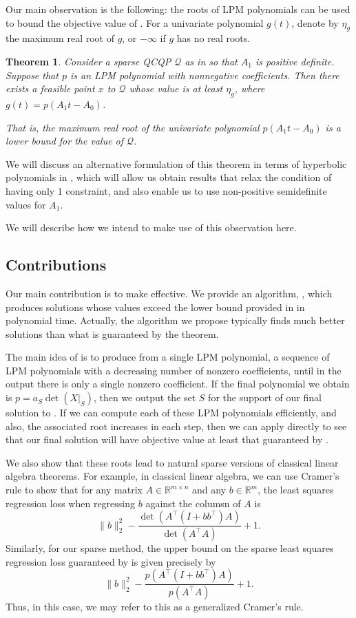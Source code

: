 \documentclass{amsart}
\newtheorem{theorem}{Theorem}[section]
\theoremstyle{definition}
\newcommand{\R}{\mathbb{R}}
\begin{document}
Our main observation is the following: the roots of LPM polynomials can be used to bound the objective value of .
For a univariate polynomial $g(t)$, denote by $\eta_g$ the maximum real root of $g$, or $-\infty$ if $g$ has no real roots.
\begin{theorem}
    \label{thm:root_thm}
    Consider a sparse QCQP $\mathcal{Q}$ as in  so that $A_1$ is positive definite.
    Suppose that $p$ is an LPM polynomial with nonnegative coefficients.
    Then there exists a feasible point $x$ to $\mathcal{Q}$ whose value is at least $\eta_g$, where $g(t) = p(A_1 t - A_0)$.

    That is, the maximum real root of the univariate polynomial $p(A_1 t - A_0)$ is a lower bound for the value of $\mathcal{Q}$.
\end{theorem}
We will discuss an alternative formulation of this theorem in terms of hyperbolic polynomials in , which will allow us obtain results that relax the condition of having only 1 constraint, and also enable us to use non-positive semidefinite values for $A_1$.

We will describe how we intend to make use of this observation here.
\subsection{Contributions}
Our main contribution is to make  effective.
We provide an algorithm, , which produces solutions whose values exceed the lower bound provided in  in polynomial time.
Actually, the algorithm we propose typically finds much better solutions than what is guaranteed by the theorem.

The main idea of  is to produce from a single LPM polynomial, a sequence of LPM polynomials with a decreasing number of nonzero coefficients, until in the output there is only a single nonzero coefficient.
If the final polynomial we obtain is $p = a_S \det(X|_S)$, then we output the set $S$ for the support of our final solution to .
If we can compute each of these LPM polynomials efficiently, and also, the associated root increases in each step, then we can apply  directly to see that our final solution will have objective value at least that guaranteed by .

We also show that these roots lead to natural sparse versions of classical linear algebra theorems.
For example, in classical linear algebra, we can use Cramer's rule to show that for any matrix $A \in \R^{m\times n}$ and any $b \in \R^m$, the least squares regression loss when regressing $b$ against the columsn of $A$ is
\[
    \|b\|_2^2 - \frac{\det(A^{\intercal} ( I + bb^{\intercal})A)}{\det(A^{\intercal}A)} + 1.
\]
Similarly, for our sparse method, the upper bound on the sparse least squares regression loss guaranteed by  is given precisely by
\[
    \|b\|_2^2 - \frac{p(A^{\intercal} ( I + bb^{\intercal})A)}{p(A^{\intercal}A)} + 1.
\]
Thus, in this case, we may refer to this as a generalized Cramer's rule.
\end{document}
